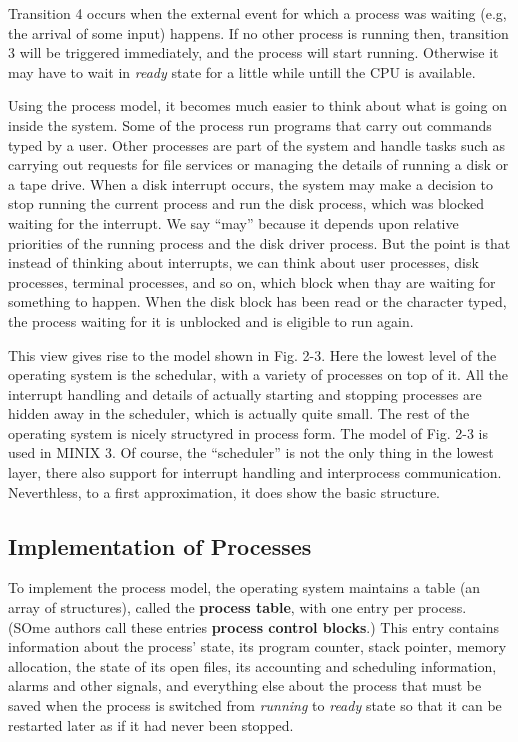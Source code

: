 \documentclass{book}
\newcommand {\kw}  [1] {\textbf{#1}}
\newcommand {\sys} [1] {\textsl{#1}}
\begin{document}
Transition 4 occurs when the external event for which a process was waiting (e.g, the arrival of some input) happens.
If no other process is running then, transition 3 will be triggered immediately,
and the process will start running.
Otherwise it may have to wait in \sys{ready} state for a little while untill the CPU is available.

Using the process model, it becomes much easier to think about what is going on inside the system.
Some of the process run programs that carry out commands typed by a user.
Other processes are part of the system and handle tasks such as carrying out requests for file services 
or managing the details of running a disk or a tape drive.
When a disk interrupt occurs, the system may make a decision to stop running the current process and run the disk process,
which was blocked waiting for the interrupt.
We say ``may'' because it depends upon relative priorities of the running process and the disk driver process.
But the point is that instead of thinking about interrupts, we can think about user processes, disk processes, terminal processes, and so on,
which block when thay are waiting for something to happen.
When the disk block has been read or the character typed, the process waiting for it is unblocked
and is eligible to run again.

This view gives rise to the model shown in Fig. 2-3.
Here the lowest level of the operating system is the schedular, with a variety of processes on top of it.
All the interrupt handling and details of actually starting and stopping processes are hidden away in the scheduler,
which is actually quite small.
The rest of the operating system is nicely structyred in process form.
The model of Fig. 2-3 is used in MINIX 3.
Of course, the ``scheduler'' is not the only thing in the lowest layer, 
there also support for interrupt handling and interprocess communication.
Neverthless, to a first approximation, it does show the basic structure.

\subsection{Implementation of Processes}
To implement the process model, the operating system maintains a table (an array of structures),
called the \kw{process table}, with one entry per process.
(SOme authors call these entries \kw{process control blocks}.)
This entry contains information about the process' state, its program counter, stack pointer, memory allocation,
the state of its open files, its accounting and scheduling information, alarms and other signals,
and everything else about the process that must be saved when the process is switched from \sys{running} to \sys{ready} state 
so that it can be restarted later as if it had never been stopped.
\end{document}
